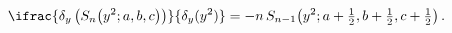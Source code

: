\[\ifrac{\delta_{y}\left(\mathop{S_{n}\/}\nolimits\!\left(y^{2};a,b,c\right)%
\right)}{\delta_{y}(y^{2})}=-n\mathop{S_{n-1}\/}\nolimits\!\left(y^{2};a+%
\tfrac{1}{2},b+\tfrac{1}{2},c+\tfrac{1}{2}\right).\]